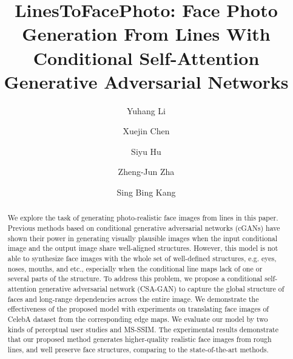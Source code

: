 \documentclass[format=acmsmall, review=false, screen=true]{acmart}
\begin{document}
\title[LinesToFacePhoto]{LinesToFacePhoto: Face Photo Generation From Lines With Conditional Self-Attention Generative Adversarial Networks}

\author{Yuhang Li}
%
%
\author{Xuejin Chen}
%
%
\author{Siyu Hu}
%
%
\author{Zheng-Jun Zha}
%
%
\author{Sing Bing Kang}

\begin{abstract}
We explore the task of generating photo-realistic face images from lines in this paper.
Previous methods based on conditional generative adversarial networks (cGANs) have shown their power in generating visually plausible images when the input conditional image and the output image share well-aligned structures. 
However, this model is not able to synthesize face images with the whole set of well-defined structures, e.g. eyes, noses, mouths, and etc., especially when the conditional line maps lack of one or several parts of the structure. 
%
To address this problem, we propose a conditional self-attention generative adversarial network (CSA-GAN) to capture the global structure of faces and long-range dependencies across the entire image. 
We demonstrate the effectiveness of the proposed model with experiments on translating face images of CelebA dataset from the corresponding edge maps. 
We evaluate our model by two kinds of perceptual user studies and MS-SSIM.
The experimental results demonstrate that our proposed method generates higher-quality realistic face images from rough lines, and well preserve face structures, comparing to the state-of-the-art methods.
\end{abstract}
\end{document}

